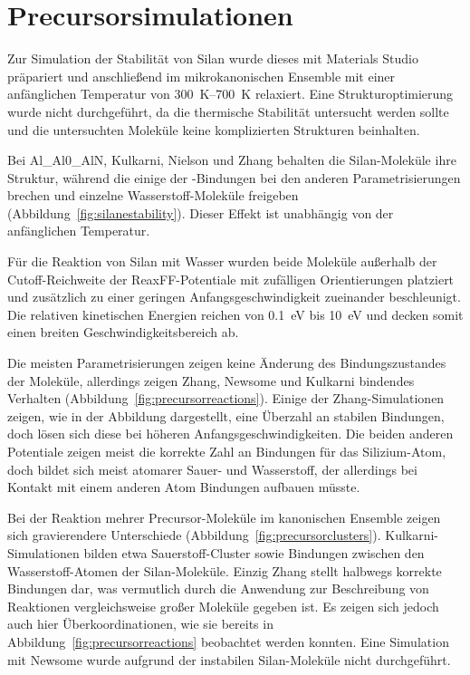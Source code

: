 \section{Precursorsimulationen}

Zur Simulation der Stabilität von Silan wurde dieses mit Materials Studio präpariert und anschließend im mikrokanonischen Ensemble mit einer anfänglichen Temperatur von \SIrange{300}{700}{\kelvin} relaxiert.
Eine Strukturoptimierung wurde nicht durchgeführt, da die thermische Stabilität untersucht werden sollte und die untersuchten Moleküle keine komplizierten Strukturen beinhalten.

Bei Al\_Al0\_AlN, Kulkarni, Nielson und Zhang behalten die Silan-Moleküle ihre Struktur, während die einige der -Bindungen bei den anderen Parametrisierungen brechen und einzelne Wasserstoff-Moleküle freigeben (Abbildung~\ref{fig:silanestability}).
Dieser Effekt ist unabhängig von der anfänglichen Temperatur.

Für die Reaktion von Silan mit Wasser wurden beide Moleküle außerhalb der Cutoff-Reichweite der ReaxFF-Potentiale mit zufälligen Orientierungen platziert und zusätzlich zu einer geringen Anfangsgeschwindigkeit zueinander beschleunigt.
Die relativen kinetischen Energien reichen von \SI{0.1}{\electronvolt} bis \SI{10}{\electronvolt} und decken somit einen breiten Geschwindigkeitsbereich ab.

Die meisten Parametrisierungen zeigen keine Änderung des Bindungszustandes der Moleküle, allerdings zeigen Zhang, Newsome und Kulkarni bindendes Verhalten (Abbildung~\ref{fig:precursorreactions}).
Einige der Zhang-Simulationen zeigen, wie in der Abbildung dargestellt, eine Überzahl an stabilen Bindungen, doch lösen sich diese bei höheren Anfangsgeschwindigkeiten.
Die beiden anderen Potentiale zeigen meist die korrekte Zahl an Bindungen für das Silizium-Atom, doch bildet sich meist atomarer Sauer- und Wasserstoff, der allerdings bei Kontakt mit einem anderen Atom Bindungen aufbauen müsste.

Bei der Reaktion mehrer Precursor-Moleküle im kanonischen Ensemble zeigen sich gravierendere Unterschiede (Abbildung~\ref{fig:precursorclusters}).
Kulkarni-Simulationen bilden etwa Sauerstoff-Cluster sowie Bindungen zwischen den Wasserstoff-Atomen der Silan-Moleküle.
Einzig Zhang stellt halbwegs korrekte Bindungen dar, was vermutlich durch die Anwendung zur Beschreibung von Reaktionen vergleichsweise großer Moleküle gegeben ist.
Es zeigen sich jedoch auch hier Überkoordinationen, wie sie bereits in Abbildung~\ref{fig:precursorreactions} beobachtet werden konnten.
Eine Simulation mit Newsome wurde aufgrund der instabilen Silan-Moleküle nicht durchgeführt.


